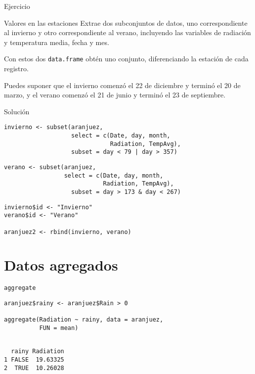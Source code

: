 \documentclass[aspectratio=169, usenames,svgnames,dvipsnames]{beamer}
\begin{document}
\begin{frame}[label={sec:orga8e3994},fragile]{Ejercicio}
 \begin{block}{Valores en las estaciones}
Extrae dos subconjuntos de datos, uno correspondiente al invierno y otro correspondiente al verano, incluyendo las variables de radiación y temperatura media, fecha y mes. 

Con estos dos \texttt{data.frame} obtén uno conjunto, diferenciando la estación de cada registro.

Puedes suponer que el invierno comenzó el 22 de diciembre y terminó el 20 de marzo, y el verano comenzó el 21 de junio y terminó el 23 de septiembre.
\end{block}
\end{frame}


\begin{frame}[label={sec:orgd966bef},fragile]{Solución}
 \lstset{language=r,label= ,caption= ,captionpos=b,numbers=none}
\begin{lstlisting}
invierno <- subset(aranjuez,
                   select = c(Date, day, month, 
                              Radiation, TempAvg),
                   subset = day < 79 | day > 357)
\end{lstlisting}

\lstset{language=r,label= ,caption= ,captionpos=b,numbers=none}
\begin{lstlisting}
verano <- subset(aranjuez,
                 select = c(Date, day, month,
                            Radiation, TempAvg),
                   subset = day > 173 & day < 267)
\end{lstlisting}

\lstset{language=r,label= ,caption= ,captionpos=b,numbers=none}
\begin{lstlisting}
invierno$id <- "Invierno"
verano$id <- "Verano"

aranjuez2 <- rbind(invierno, verano)
\end{lstlisting}
\end{frame}


\section{Datos agregados}
\label{sec:org67886a3}

\begin{frame}[label={sec:org09343a5},fragile]{\texttt{aggregate}}
 \lstset{language=r,label= ,caption= ,captionpos=b,numbers=none}
\begin{lstlisting}
aranjuez$rainy <- aranjuez$Rain > 0

aggregate(Radiation ~ rainy, data = aranjuez,
          FUN = mean)
\end{lstlisting}

\begin{verbatim}

  rainy Radiation
1 FALSE  19.63325
2  TRUE  10.26028
\end{verbatim}
\end{frame}
\end{document}
